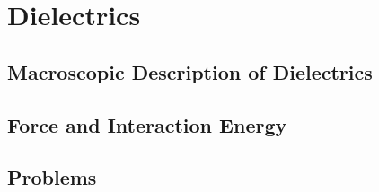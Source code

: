 \setcounter{chapter}{0}
\renewcommand{\thechapter}{3}
\chapter{Dielectrics}\label{ch:3}
\setcounter{equation}{0}	        %

\section{Macroscopic Description of Dielectrics}

\section{Force and Interaction Energy}


\section*{Problems}


